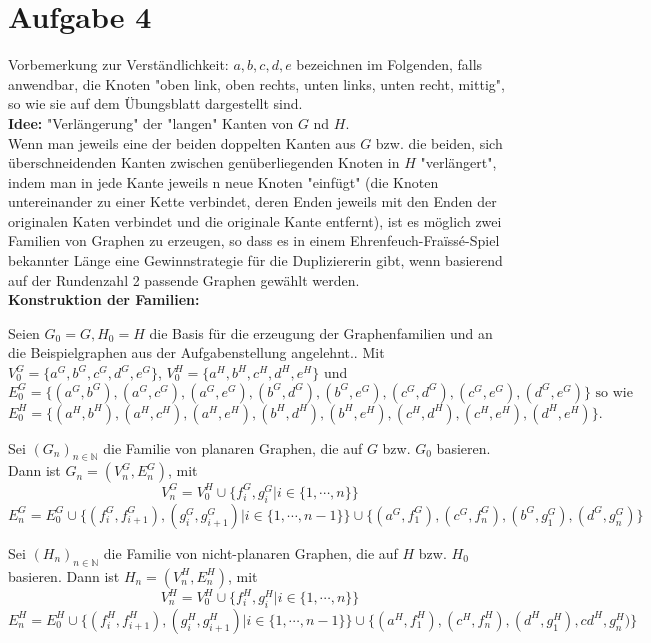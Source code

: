 \documentclass[11pt, a4paper]{article}
\begin{document}
\section*{Aufgabe 4}
Vorbemerkung zur Verständlichkeit: $a,b,c,d,e$ bezeichnen im Folgenden, falls anwendbar, die Knoten "oben link, oben rechts, unten links, unten recht, mittig", so wie sie auf dem Übungsblatt dargestellt sind.\\

\textbf{Idee:} "Verlängerung" der "langen" Kanten von $G$ nd $H$.\\
Wenn man jeweils eine der beiden doppelten Kanten aus $G$ bzw. die beiden, sich überschneidenden Kanten zwischen genüberliegenden Knoten in $H$ "verlängert", indem man in jede Kante jeweils n neue Knoten "einfügt"
(die Knoten untereinander zu einer Kette verbindet, deren Enden jeweils mit den Enden der originalen Katen verbindet und die originale Kante entfernt),
ist es möglich zwei Familien von Graphen zu erzeugen, so dass es in einem Ehrenfeuch-Fra\"iss\'e-Spiel bekannter Länge eine Gewinnstrategie für die Dupliziererin gibt, wenn basierend auf der Rundenzahl 2 passende Graphen gewählt werden.\\

\textbf{Konstruktion der Familien:}

Seien $G_0 = G, H_0 = H$ die Basis für die erzeugung der Graphenfamilien und an die Beispielgraphen aus der Aufgabenstellung angelehnt..
Mit $V^G_0 = \{a^G,b^G,c^G,d^G,e^G\}$, $V^H_0 = \{a^H,b^H,c^H,d^H,e^H\}$ und
$$E^G_0 = \{ (a^G,b^G), (a^G, c^G), (a^G,e^G), (b^G,d^G), (b^G,e^G), (c^G,d^G), (c^G,e^G), (d^G,e^G) \} \text{ so wie}$$
$$E^H_0 = \{ (a^H,b^H), (a^H, c^H), (a^H,e^H), (b^H,d^H), (b^H,e^H), (c^H,d^H), (c^H,e^H), (d^H,e^H) \} \text{.}$$

Sei $(G_n)_{n \in \mathbb{N}}$ die Familie von planaren Graphen, die auf $G$ bzw. $G_0$ basieren.
Dann ist $G_n = (V^G_n, E^G_n)$, mit
$$V^G_n = V^H_0 \cup \{f^G_i, g^G_i | i \in \{1, \cdots, n\} \}$$
$$E^G_n = E^G_0 \cup \{ (f^G_i, f^G_{i+1}), (g^G_i, g^G_{i+1}) | i \in \{1, \cdots, n-1\} \} \cup \{ (a^G, f^G_1), (c^G, f^G_n), (b^G, g^G_1), (d^G, g^G_n) \}$$

Sei $(H_n)_{n \in \mathbb{N}}$ die Familie von nicht-planaren Graphen, die auf $H$ bzw. $H_0$ basieren.
Dann ist $H_n = (V^H_n, E^H_n)$, mit
$$V^H_n = V^H_0 \cup \{f^H_i, g^H_i | i \in \{1, \cdots, n\} \}$$
$$E^H_n = E^H_0 \cup \{ (f^H_i, f^H_{i+1}), (g^H_i, g^H_{i+1}) | i \in \{1, \cdots, n-1\} \} \cup \{ (a^H, f^H_1), (c^H, f^H_n), (d^H, g^H_1), cd^H, g^H_n) \}$$
\\
\end{document}
